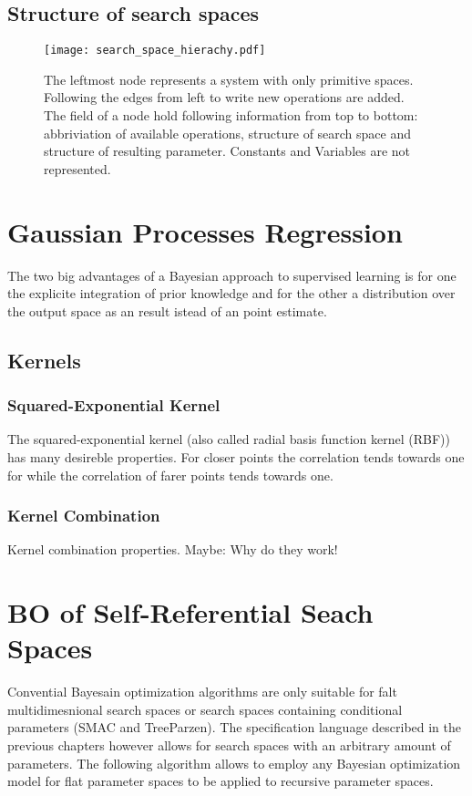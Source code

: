 \documentclass[english]{article}
\begin{document}
\subsection{Structure of search spaces}

\begin{figure}
\texttt{[image: search\_space\_hierachy.pdf]}

  \caption{The leftmost node represents a system with only primitive spaces. Following the edges from left to write new operations are added. The field of a node hold following information from top to bottom: abbriviation of available operations, structure of search space and structure of resulting parameter. Constants and Variables are not represented.}
  \label{fig_spaces}
\end{figure}


\section{Gaussian Processes Regression}
The two big advantages of a Bayesian approach to supervised learning is for one the explicite integration of prior knowledge and for the other a distribution over the output space as an result istead of an point estimate.

\subsection{Kernels}

\subsubsection{Squared-Exponential Kernel}
The squared-exponential kernel (also called radial basis function kernel (RBF)) has many desireble properties. For closer points the correlation tends towards one for while the correlation of farer points tends towards one.

\subsubsection{Kernel Combination}
Kernel combination properties. Maybe: Why do they work!


\section{BO of Self-Referential Seach Spaces}

Convential Bayesain optimization algorithms are only suitable for falt multidimesnional search spaces or search spaces containing conditional parameters (SMAC and TreeParzen). The specification language described in the previous chapters however allows for search spaces with an arbitrary amount of parameters. The following algorithm allows to employ any Bayesian optimization model for flat parameter spaces to be applied to recursive parameter spaces.
\end{document}
